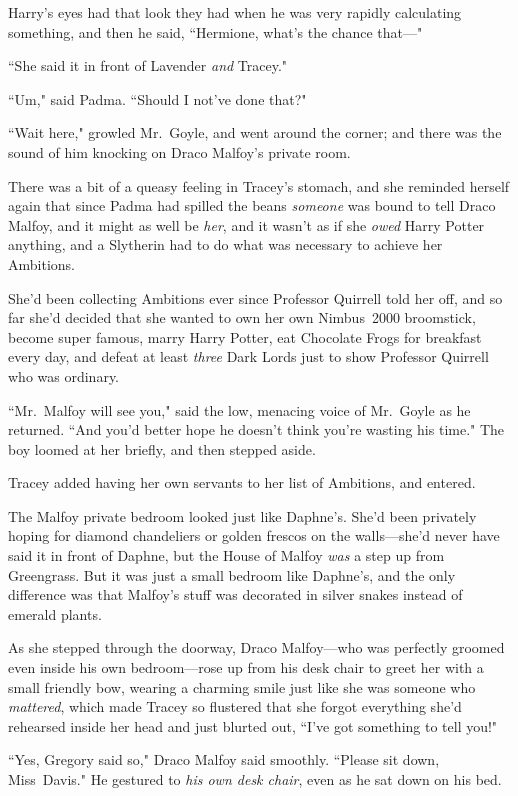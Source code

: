 Harry's eyes had that look they had when he was very rapidly calculating something, and then he said, ``Hermione, what's the chance that—"

``She said it in front of Lavender \emph{and} Tracey."

``Um," said Padma. ``Should I not've done that?"

\later

``Wait here," growled Mr.~Goyle, and went around the corner; and there was the sound of him knocking on Draco Malfoy's private room.

There was a bit of a queasy feeling in Tracey's stomach, and she reminded herself again that since Padma had spilled the beans \emph{someone} was bound to tell Draco Malfoy, and it might as well be \emph{her}, and it wasn't as if she \emph{owed} Harry Potter anything, and a Slytherin had to do what was necessary to achieve her Ambitions.

She'd been collecting Ambitions ever since Professor Quirrell told her off, and so far she'd decided that she wanted to own her own Nimbus~2000 broomstick, become super famous, marry Harry Potter, eat Chocolate Frogs for breakfast every day, and defeat at least \emph{three} Dark Lords just to show Professor Quirrell who was ordinary.

``Mr.~Malfoy will see you," said the low, menacing voice of Mr.~Goyle as he returned. ``And you'd better hope he doesn't think you're wasting his time." The boy loomed at her briefly, and then stepped aside.

Tracey added having her own servants to her list of Ambitions, and entered.

The Malfoy private bedroom looked just like Daphne's. She'd been privately hoping for diamond chandeliers or golden frescos on the walls—she'd never have said it in front of Daphne, but the House of Malfoy \emph{was} a step up from Greengrass. But it was just a small bedroom like Daphne's, and the only difference was that Malfoy's stuff was decorated in silver snakes instead of emerald plants.

As she stepped through the doorway, Draco Malfoy—who was perfectly groomed even inside his own bedroom—rose up from his desk chair to greet her with a small friendly bow, wearing a charming smile just like she was someone who \emph{mattered}, which made Tracey so flustered that she forgot everything she'd rehearsed inside her head and just blurted out, ``I've got something to tell you!"

``Yes, Gregory said so," Draco Malfoy said smoothly. ``Please sit down, Miss~Davis." He gestured to \emph{his own desk chair}, even as he sat down on his bed.

